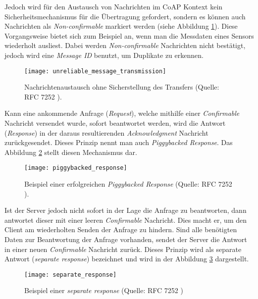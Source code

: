 Jedoch wird für den Austausch von Nachrichten im CoAP Kontext kein Sicherheitsmechanismus für die Übertragung gefordert, sondern es können auch Nachrichten als \textit{Non-confirmable} markiert werden (siehe Abbildung \ref{fig:nachrichtenaustausch-ohne-sicherstellung-des-transfers}). Diese Vorgangsweise bietet sich zum Beispiel an, wenn man die Messdaten eines Sensors wiederholt ausliest. Dabei werden \textit{Non-confirmable} Nachrichten nicht bestätigt, jedoch wird eine \textit{Message ID} benutzt, um Duplikate zu erkennen.

\begin{figure}[h]
    \centering
    \texttt{[image: unreliable\_message\_transmission]}
    \caption{Nachrichtenaustausch ohne Sicherstellung des Transfers (Quelle: RFC 7252 \autocite{RFC7252}).}
    \label{fig:nachrichtenaustausch-ohne-sicherstellung-des-transfers}
\end{figure}

Kann eine ankommende Anfrage (\textit{Request}), welche mithilfe einer \textit{Confirmable} Nachricht versendet wurde, sofort beantwortet werden, wird die Antwort (\textit{Response}) in der daraus resultierenden \textit{Acknowledgment} Nachricht zurückgesendet. Dieses Prinzip nennt man auch \textit{Piggybacked Response}. Das Abbildung \ref{fig:beispiel-eines-erfolgreichen-piggybacked-response} stellt diesen Mechanismus dar.

\begin{figure}[h]
    \centering
    \texttt{[image: piggybacked\_response]}
    \caption{Beispiel einer erfolgreichen \textit{Piggybacked Response} (Quelle: RFC 7252 \cite{RFC7252}).}
    \label{fig:beispiel-eines-erfolgreichen-piggybacked-response}
\end{figure}

Ist der Server jedoch nicht sofort in der Lage die Anfrage zu beantworten, dann antwortet dieser mit einer leeren \textit{Confirmable} Nachricht. Dies macht er, um den Client am wiederholten Senden der Anfrage zu hindern. Sind alle benötigten Daten zur Beantwortung der Anfrage vorhanden, sendet der Server die Antwort in einer neuen \textit{Confirmable} Nachricht zurück. Dieses Prinzip wird als separate Antwort (\textit{separate response}) bezeichnet und wird in der Abbildung \ref{fig:beispiel-einer-separate-response} dargestellt.

\begin{figure}[h]
    \centering
    \texttt{[image: separate\_response]}
    \caption{Beispiel einer \textit{separate response} (Quelle: RFC 7252 \cite{RFC7252})}
    \label{fig:beispiel-einer-separate-response}
\end{figure}


